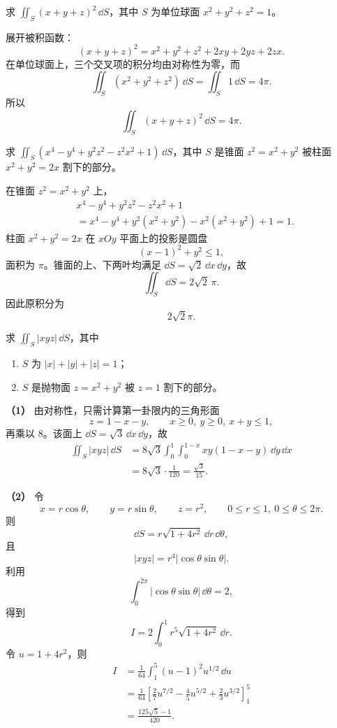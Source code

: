 \begin{xexercise}[3]
求 $\iint_S(x+y+z)^2\,\dd S$，其中 $S$ 为单位球面 $x^2+y^2+z^2=1$。
\end{xexercise}
\begin{xsolution}
展开被积函数：
\[
  (x+y+z)^2=x^2+y^2+z^2+2xy+2yz+2zx.
\]
在单位球面上，三个交叉项的积分均由对称性为零，而
\[
  \iint_S(x^2+y^2+z^2)\,\dd S=\iint_S1\,\dd S=4\pi.
\]
所以
\[
  \iint_S(x+y+z)^2\,\dd S=4\pi.
\]
\end{xsolution}


\begin{xexercise}[4]
求 $\iint_S(x^4-y^4+y^2z^2-z^2x^2+1)\,\dd S$，其中 $S$ 是锥面 $z^2=x^2+y^2$ 被柱面 $x^2+y^2=2x$ 割下的部分。
\end{xexercise}
\begin{xsolution}
在锥面 $z^2=x^2+y^2$ 上，
\begin{align*}
&x^4-y^4+y^2z^2-z^2x^2+1\\
&=x^4-y^4+y^2(x^2+y^2)-x^2(x^2+y^2)+1=1.
\end{align*}
柱面 $x^2+y^2=2x$ 在 $xOy$ 平面上的投影是圆盘
\[
  (x-1)^2+y^2\le1,
\]
面积为 $\pi$。锥面的上、下两叶均满足 $\dd S=\sqrt2\,\dd x\,\dd y$，故
\[
  \iint_S\dd S=2\sqrt2\,\pi.
\]
因此原积分为
\[
  \boxed{2\sqrt2\pi}.
\]
\end{xsolution}


\begin{xexercise}[5]
求 $\iint_S|xyz|\,\dd S$，其中
\begin{enumerate}[label=(\arabic*)]
\item $S$ 为 $|x|+|y|+|z|=1$；
\item $S$ 是抛物面 $z=x^2+y^2$ 被 $z=1$ 割下的部分。
\end{enumerate}
\end{xexercise}
\begin{xsolution}
\textbf{（1）}\quad
由对称性，只需计算第一卦限内的三角形面
\[
  z=1-x-y,\qquad x\ge0,\ y\ge0,\ x+y\le1,
\]
再乘以 $8$。该面上 $\dd S=\sqrt3\,\dd x\,\dd y$，故
\begin{align*}
\iint_S|xyz|\,\dd S
&=8\sqrt3\int_0^1\int_0^{1-x}xy(1-x-y)\,\dd y\,\dd x\\
&=8\sqrt3\cdot\frac1{120}
=\frac{\sqrt3}{15}.
\end{align*}

\textbf{（2）}\quad
令
\[
  x=r\cos\theta,\qquad y=r\sin\theta,\qquad z=r^2,
  \qquad 0\le r\le1,\ 0\le\theta\le2\pi.
\]
则
\[
  \dd S=r\sqrt{1+4r^2}\,\dd r\,\dd\theta,
\]
且
\[
  |xyz|=r^4|\cos\theta\sin\theta|.
\]
利用
\[
  \int_0^{2\pi}|\cos\theta\sin\theta|\,\dd\theta=2,
\]
得到
\[
  I=2\int_0^1r^5\sqrt{1+4r^2}\,\dd r.
\]
令 $u=1+4r^2$，则
\begin{align*}
I
&=\frac1{64}\int_1^5(u-1)^2u^{1/2}\,\dd u\\
&=\frac1{64}\left[\frac27u^{7/2}-\frac45u^{5/2}+\frac23u^{3/2}\right]_1^5\\
&=\frac{125\sqrt5-1}{420}.
\end{align*}
\end{xsolution}


